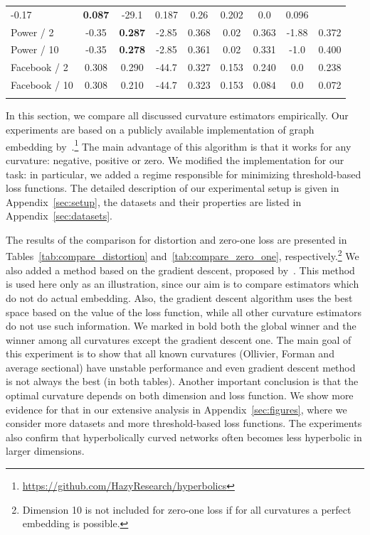 \documentclass{article} %
\begin{document}
\begin{table}[t]
\begin{center}
\begin{tabular}{lcccccc|cc}
-0.17 & \textbf{0.087} & 
-29.1 & 0.187 & 
0.26 & 0.202 & 
0.0 & 0.096 \\
Power / 2 &
-0.35 & \textbf{0.287} &
-2.85 & 0.368 &
0.02 & 0.363 &
-1.88 & 0.372  \\
Power / 10 &
-0.35 & \textbf{0.278} &
 -2.85 &0.361 &
 0.02 & 0.331 &
-1.0 & 0.400  \\
Facebook / 2 &
0.308 & 0.290 & 
-44.7 & 0.327 & 
0.153 & 0.240 & 
0.0 & 0.238  \\
Facebook / 10 &
0.308 & 0.210 &
-44.7 & 0.323 & 
0.153 & 0.084 & 
0.0 & 0.072 \\
\hline \\
\end{tabular}
\end{center}
\end{table}

In this section, we compare all discussed curvature estimators empirically. Our experiments are based on a publicly available implementation of graph embedding by~\citet{gu2019learning}.\footnote{\url{https://github.com/HazyResearch/hyperbolics}} The main advantage of this algorithm is that it works for any curvature: negative, positive or zero. We modified the implementation for our task: in particular, we added a regime responsible for minimizing threshold-based loss functions. The detailed description of our experimental setup is given in Appendix~\ref{sec:setup}, the datasets and their properties are listed in Appendix~\ref{sec:datasets}.

The results of the comparison for distortion and zero-one loss are presented in Tables~\ref{tab:compare_distortion} and~\ref{tab:compare_zero_one}, 
respectively.\footnote{Dimension 10 is not included for zero-one loss if for all curvatures a perfect embedding is possible.} We also added a method based on the gradient descent, proposed by~\citet{gu2019learning}. This method is used here only as an illustration, since our aim is to compare estimators which do not do actual embedding.
Also, the gradient descent algorithm uses the best space based on the value of the loss function, while all other curvature estimators do not use such information.
We marked in bold both the global winner and the winner among all curvatures except the gradient descent one. The main goal of this experiment is to show that all known curvatures (Ollivier, Forman and average sectional) have unstable performance
and even gradient descent method is not always the best (in both tables). 
Another important conclusion is that the optimal curvature depends on both dimension and loss function. We show more evidence for that in our extensive analysis in Appendix~\ref{sec:figures}, where we consider more datasets and more threshold-based loss functions. The experiments also confirm that         hyperbolically curved networks often becomes less hyperbolic in larger dimensions. 
\end{document}
